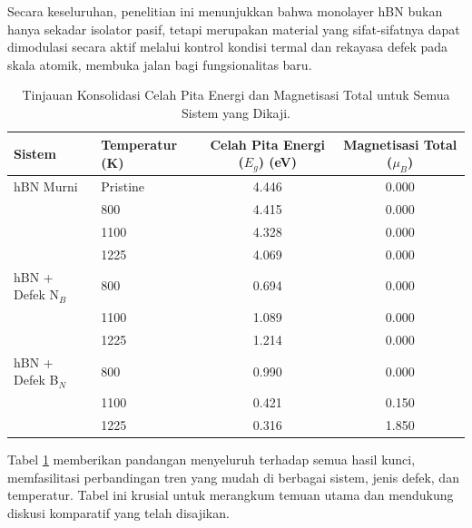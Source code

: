 Secara keseluruhan, penelitian ini menunjukkan bahwa monolayer hBN bukan hanya sekadar isolator pasif, tetapi merupakan material yang sifat-sifatnya dapat dimodulasi secara aktif melalui kontrol kondisi termal dan rekayasa defek pada skala atomik, membuka jalan bagi fungsionalitas baru. \begin{table}[h!]
  \centering
  \caption{Tinjauan Konsolidasi Celah Pita Energi dan Magnetisasi Total untuk Semua Sistem yang Dikaji.}
  \label{tab:konsolidasi_eg_mag}
  \begin{tabular}{llcc}
    \toprule
    Sistem & Temperatur (K) & Celah Pita Energi ($E_g$) (eV) & Magnetisasi Total ($\mu_B$) \\
    \midrule
    hBN Murni & Pristine & 4.446 & 0.000 \\
              & 800      & 4.415 & 0.000 \\
              & 1100     & 4.328 & 0.000 \\
              & 1225     & 4.069 & 0.000 \\
    \midrule
    hBN + Defek N$_B$ & 800  & 0.694 &  0.000 \\
                      & 1100 & 1.089 &  0.000 \\
                      & 1225 & 1.214 &  0.000 \\
    \midrule
    hBN + Defek B$_N$ & 800  & 0.990 &  0.000 \\
                      & 1100 & 0.421 &  0.150 \\
                      & 1225 & 0.316 &  1.850 \\
    \bottomrule
  \end{tabular}
\end{table}
Tabel \ref{tab:konsolidasi_eg_mag} memberikan pandangan menyeluruh terhadap semua hasil kunci, memfasilitasi perbandingan tren yang mudah di berbagai sistem, jenis defek, dan temperatur. Tabel ini krusial untuk merangkum temuan utama dan mendukung diskusi komparatif yang telah disajikan.